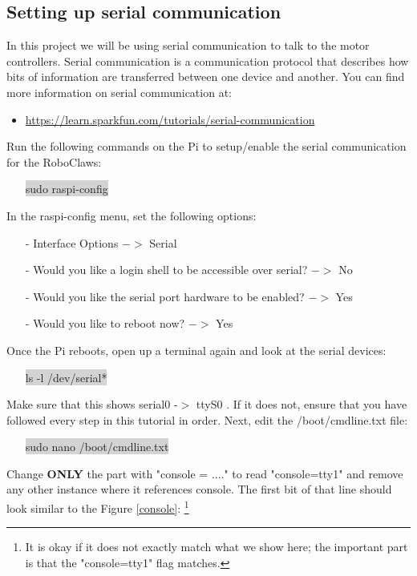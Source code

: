 \documentclass{article}
\begin{document}
\subsection{Setting up serial communication}

In this project we will be using serial communication to talk to the motor controllers. Serial communication is a communication protocol that describes how bits of information are transferred between one device and another. You can find more information on serial communication at:
\begin{itemize}
	\item \href{https://learn.sparkfun.com/tutorials/serial-communication}{https://learn.sparkfun.com/tutorials/serial-communication}
\end{itemize}

\noindent Run the following commands on the Pi to setup/enable the serial communication for the RoboClaws:
\begin{itemize}
	\item[] \colorbox{lightgray}{sudo raspi-config}
\end{itemize}

\noindent In the raspi-config menu, set the following options:
\begin{itemize}
	\item[-]  Interface Options $-> $ Serial
	\item[-] Would you like a login shell to be accessible over serial? $->$ No
	\item[-] Would you like the serial port hardware to be enabled? $->$ Yes
	\item[-] Would you like to reboot now? $->$ Yes
\end{itemize}
\noindent Once the Pi reboots, open up a terminal again and look at the serial devices:
\begin{itemize}
	\item[] \colorbox{lightgray}{ls -l /dev/serial*}
\end{itemize}
Make sure that this shows serial0 -$>$ ttyS0 . If it does not, ensure that you have followed every step in this tutorial in order. Next, edit the /boot/cmdline.txt file:
\begin{itemize}
	\item [] \colorbox{lightgray}{sudo nano /boot/cmdline.txt}
\end{itemize}

\noindent Change \textbf{ONLY} the part with "console = ...." to read "console=tty1" and remove any other instance where it references console. The first bit of that line should look similar to the Figure \ref{console}: \footnote{It is okay if it does not exactly match what we show here; the important part is that the "console=tty1" flag matches.}
\end{document}
